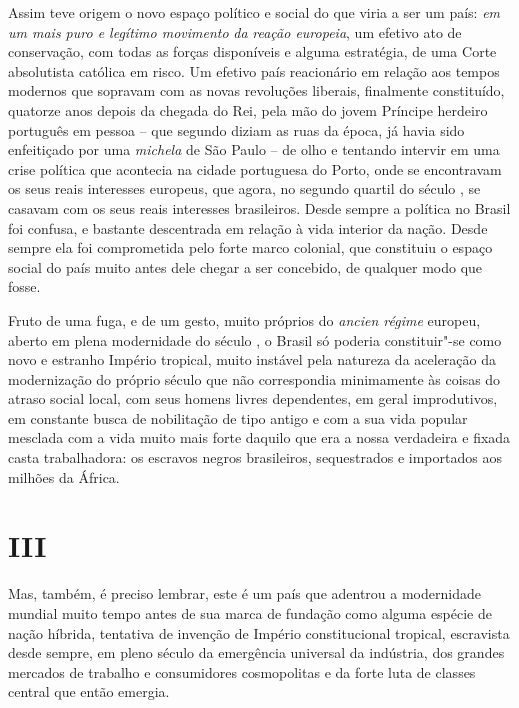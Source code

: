 Assim teve origem o novo espaço político e social do que viria a ser um
país: \emph{em um mais puro e legítimo movimento} \emph{da} \emph{reação
europeia}, um efetivo ato de conservação, com todas as forças
disponíveis e alguma estratégia, de uma Corte absolutista católica em
risco. Um efetivo país reacionário em relação aos tempos modernos que
sopravam com as novas revoluções liberais, finalmente constituído,
quatorze anos depois da chegada do Rei, pela mão do jovem Príncipe
herdeiro português em pessoa -- que segundo diziam as ruas da época, já
havia sido enfeitiçado por uma \emph{michela} de São Paulo -- de olho e
tentando intervir em uma crise política que acontecia na cidade
portuguesa do Porto, onde se encontravam os seus reais interesses
europeus, que agora, no segundo quartil do século , se casavam com os
seus reais interesses brasileiros. Desde sempre a política no Brasil foi
confusa, e bastante descentrada em relação à vida interior da nação.
Desde sempre ela foi comprometida pelo forte marco colonial, que
constituiu o espaço social do país muito antes dele chegar a ser
concebido, de qualquer modo que fosse.

Fruto de uma fuga, e de um gesto, muito próprios do \emph{ancien régime}
europeu, aberto em plena modernidade do século , o Brasil só poderia
constituir"-se como novo e estranho Império tropical, muito instável pela
natureza da aceleração da modernização do próprio século que não
correspondia minimamente às coisas do atraso social local, com seus
homens livres dependentes, em geral improdutivos, em constante busca de
nobilitação de tipo antigo e com a sua vida popular mesclada com a vida
muito mais forte daquilo que era a nossa verdadeira e fixada casta
trabalhadora: os escravos negros brasileiros, sequestrados e importados
aos milhões da África.\\

\section{III}

Mas, também, é preciso lembrar, este é um país que adentrou a
modernidade mundial muito tempo antes de sua marca de fundação como
alguma espécie de nação híbrida, tentativa de invenção de Império
constitucional tropical, escravista desde sempre, em pleno século da
emergência universal da indústria, dos grandes mercados de trabalho e
consumidores cosmopolitas e da forte luta de classes central que então
emergia.

